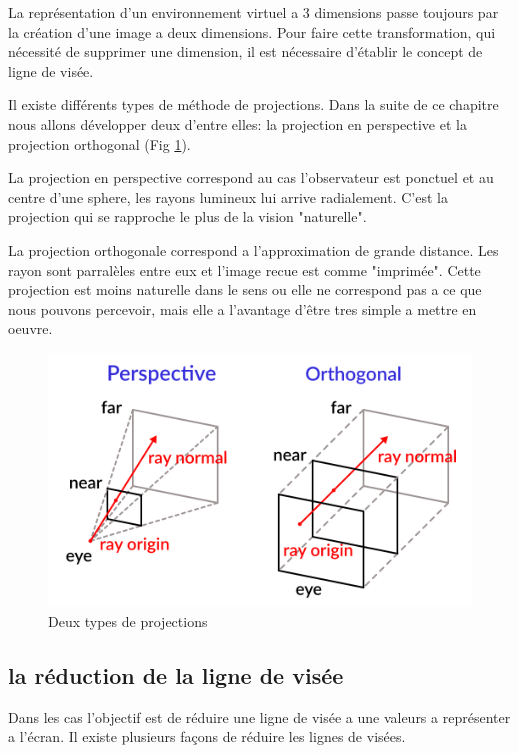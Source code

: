 La représentation d'un environnement virtuel a 3 dimensions passe toujours par la création d'une image a deux dimensions.
Pour faire cette transformation, qui nécessité de supprimer une dimension, il est nécessaire d'établir le concept de ligne de visée.

Il existe différents types de méthode de projections.
Dans la suite de ce chapitre nous allons développer deux d'entre elles: la projection en perspective et la projection orthogonal (Fig \ref{fig:raycast_projection}).

La projection en perspective correspond au cas l'observateur est ponctuel et au centre d'une sphere, les rayons lumineux lui arrive radialement.
C'est la projection qui se rapproche le plus de la vision "naturelle".

La projection orthogonale correspond a l'approximation de grande distance.
Les rayon sont parralèles entre eux et l'image recue est comme "imprimée".
Cette projection est moins naturelle dans le sens ou elle ne correspond pas a ce que nous pouvons percevoir, mais elle a l'avantage d'être tres simple a mettre en oeuvre.



\begin{figure}[bth]
        \includegraphics[width=.95\linewidth]{img/04/raycast_projection.png} 
        \caption{Deux types de projections}
 		\label{fig:raycast_projection}
\end{figure}


\subsection{la réduction de la ligne de visée}

Dans les cas l'objectif est de réduire une ligne de visée a une valeurs a représenter a l’écran.
Il existe plusieurs façons de réduire les lignes de visées.

